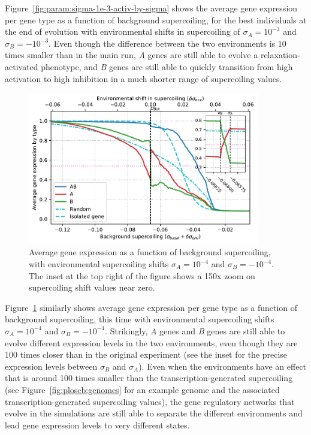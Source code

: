 Figure~\ref{fig:param:sigma-1e-3-activ-by-sigma} shows the average gene expression per gene type as a function of background supercoiling, for the best individuals at the end of evolution with environmental shifts in supercoiling of $\sigma_A = 10^{-3}$ and $\sigma_B = -10^{-3}$.
Even though the difference between the two environments is 10 times smaller than in the main run, \emph{A} genes are still able to evolve a relaxation-activated phenotype, and \emph{B} genes are still able to quickly transition from high activation to high inhibition in a much shorter range of supercoiling values.

\begin{figure}[H]
\centering
\includegraphics[width=0.9\textwidth]{param/sigma/sigma-1e-4/activity_sigmas_avg.pdf}
\caption[Average gene expression as a function of background supercoiling, with an absolute environmental supercoiling shift of 0.0001]{Average gene expression as a function of background supercoiling, with environmental supercoiling shifts $\sigma_A = 10^{-4}$ and $\sigma_B = -10^{-4}$.
The inset at the top right of the figure shows a 150x zoom on supercoiling shift values near zero.}
\label{fig:param:sigma-1e-4-activ-by-sigma}
\end{figure}

Figure~\ref{fig:param:sigma-1e-4-activ-by-sigma} similarly shows average gene expression per gene type as a function of background supercoiling, this time with environmental supercoiling shifts $\sigma_A = 10^{-4}$ and $\sigma_B = -10^{-4}$.
Strikingly, \emph{A} genes and \emph{B} genes are still able to evolve different expression levels in the two environments, even though they are 100 times closer than in the original experiment (see the inset for the precise expression levels between $\sigma_B$ and $\sigma_A$).
Even when the environments have an effect that is around 100 times smaller than the transcription-generated supercoiling (see Figure~\ref{fig:ploscb:genomes} for an example genome and the associated transcription-generated supercoiling values), the gene regulatory networks that evolve in the simulations are still able to separate the different environments and lead gene expression levels to very different states.

